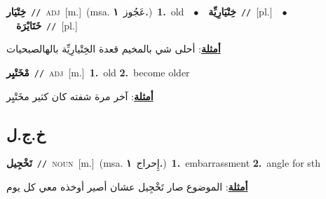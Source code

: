 \documentclass[10pt,a4paper,twoside]{article} %
\begin{document}
\begin{multicols}{2}
{{{{{{{\setlength\topsep{0pt}\textbf{\foreignlanguage{arabic}{خِتْيَار}}\ {\color{gray}\texttt{//}\color{black}}\ \textsc{adj}\ [m.]\ \color{gray}(msa. \foreignlanguage{arabic}{عَجُوز}~\foreignlanguage{arabic}{\textbf{١.}})\color{black}\ \textbf{1.}~old\ \ $\bullet$\ \ \setlength\topsep{0pt}\textbf{\foreignlanguage{arabic}{خِتْيَارِيِّة}}\ {\color{gray}\texttt{//}\color{black}}\ [pl.]\ \ $\bullet$\ \ \setlength\topsep{0pt}\textbf{\foreignlanguage{arabic}{خَتَايْرَة}}\ {\color{gray}\texttt{//}\color{black}}\ [pl.]\  \begin{flushright}\color{gray}\foreignlanguage{arabic}{\textbf{\underline{\foreignlanguage{arabic}{أمثلة}}}: أحلى شي بالمخيم قعدة الخِتْيارِيِّة  بالهالصبحيات}\end{flushright}\color{black}} \vspace{2mm}

{\setlength\topsep{0pt}\textbf{\foreignlanguage{arabic}{مْخَتْيِر}}\ {\color{gray}\texttt{//}\color{black}}\ \textsc{adj}\ [m.]\ \textbf{1.}~old  \textbf{2.}~become older\  \begin{flushright}\color{gray}\foreignlanguage{arabic}{\textbf{\underline{\foreignlanguage{arabic}{أمثلة}}}: آخر مرة شفته كان كثير مخَتْيِر}\end{flushright}\color{black}} \vspace{2mm}

\vspace{-3mm}
\subsection*{\color{blue}\foreignlanguage{arabic}{خ.ج.ل}\color{blue}{}} 

{\setlength\topsep{0pt}\textbf{\foreignlanguage{arabic}{تَخْجِيل}}\ {\color{gray}\texttt{//}\color{black}}\ \textsc{noun}\ [m.]\ \color{gray}(msa. \foreignlanguage{arabic}{إِحراج}~\foreignlanguage{arabic}{\textbf{١.}})\color{black}\ \textbf{1.}~embarrassment  \textbf{2.}~angle for sth\  \begin{flushright}\color{gray}\foreignlanguage{arabic}{\textbf{\underline{\foreignlanguage{arabic}{أمثلة}}}: الموضوع صار تَخْجِيل عشان أصير أوخذه معي كل يوم}\end{flushright}\color{black}} \vspace{2mm}

}}}}}}
\end{multicols}
\end{document}
